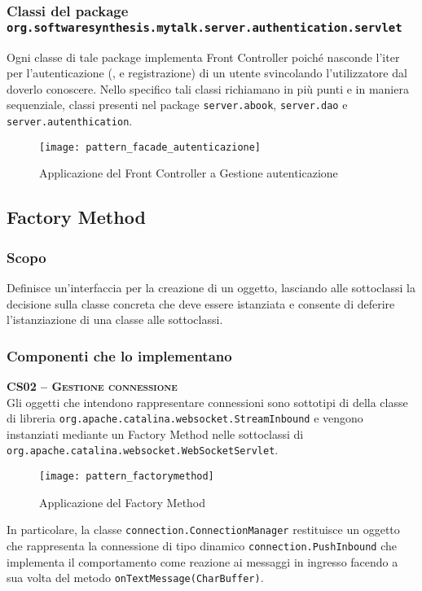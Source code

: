 \subsubsection*{Classi del package \texttt{org.softwaresynthesis.mytalk.server.authentication.servlet}}

Ogni classe di tale package implementa Front Controller poiché nasconde l'iter per l'autenticazione (,   e registrazione) di un utente svincolando l'utilizzatore dal doverlo conoscere. Nello specifico tali classi richiamano in più punti e in maniera sequenziale, classi presenti nel package \texttt{server.abook}, \texttt{server.dao} e \texttt{server.autenthication}.

\begin{figure}[H]
  \centering
  \texttt{[image: pattern\_facade\_autenticazione]}
  \caption{Applicazione del  Front Controller a \textsf{Gestione autenticazione}}\label{fig:facademessage}
\end{figure}


\subsection{Factory Method}\label{sec:patternfactorymethod}

\subsubsection{Scopo}
Definisce un'interfaccia per la creazione di un oggetto, lasciando alle sottoclassi la decisione sulla classe concreta che deve essere istanziata e consente di deferire l'istanziazione di una classe alle sottoclassi.

\subsubsection{Componenti che lo implementano}
\begin{description}

  \item{\scshape\bfseries CS02 -- Gestione connessione}\\
Gli oggetti che intendono rappresentare connessioni sono sottotipi di della classe di libreria \texttt{org.apache.catalina.websocket.StreamInbound} e vengono instanziati mediante un Factory Method nelle sottoclassi di \texttt{org.apache.catalina.websocket.WebSocketServlet}.

\begin{figure}[H]
  \centering
  \texttt{[image: pattern\_factorymethod]}
  \caption{Applicazione del  Factory Method}\label{fig:factory_method}
\end{figure}

In particolare, la classe \texttt{connection.ConnectionManager} restituisce un oggetto che rappresenta la connessione di tipo dinamico \texttt{connection.PushInbound} che implementa il comportamento come reazione ai messaggi in ingresso facendo a sua volta  del metodo \texttt{onTextMessage(CharBuffer)}.
\end{description}

